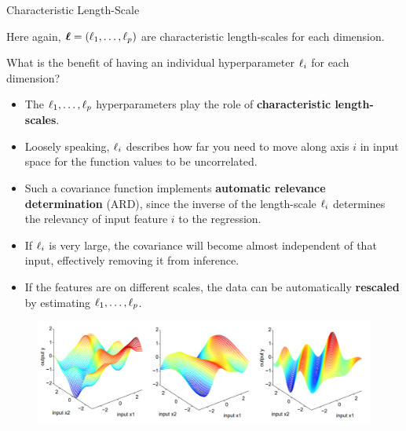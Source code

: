 \begin{frame}[c,allowframebreaks]{Characteristic Length-Scale}
\lz 
\lz

Here again, $\bm{\ell} = (\ell_1,\dots, \ell_p)$ are characteristic length-scales for each dimension. 


\framebreak

What is the benefit of having an individual hyperparameter $\ell_i$ for each dimension?

\vspace{4mm}

\begin{itemize} 
\item The $\ell_1,\dots, \ell_p$ hyperparameters play the role of \textbf{characteristic length-scales}.
\vspace{2mm}
\item Loosely speaking, $\ell_i$ describes how far you need to move along axis $i$ in input space for the function values to be uncorrelated.
\vspace{2mm}
\item Such a covariance function implements \textbf{automatic relevance determination} (ARD), since the inverse of the length-scale $\ell_i$ determines the relevancy of input feature $i$ to the regression.
\vspace{2mm}
\item If $\ell_i$ is very large, the covariance will become almost independent of that input, effectively removing it from inference.
\vspace{2mm}
\item If the features are on different scales, the data can be automatically \textbf{rescaled} by estimating $\ell_1,\dots, \ell_p$. 

\end{itemize}



\framebreak


\begin{figure}
	\includegraphics[width = .8\textwidth]{figure_man/covariance2D.png}
\end{figure}


\end{frame}
